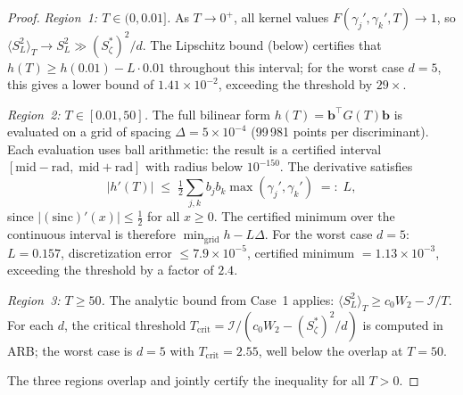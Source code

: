 \documentclass[12pt,reqno]{amsart}
\theoremstyle{plain}
\theoremstyle{definition}
\theoremstyle{remark}
\begin{document}
\begin{proof}
\smallskip\noindent\emph{Region~1: $T \in (0, 0.01]$.}  As $T \to 0^+$, all kernel values $F(\gamma_j', \gamma_k', T) \to 1$, so $\langle S_L^2\rangle_T \to S_L^2 \gg (S_\zeta^*)^2/d$.  The Lipschitz bound (below) certifies that $h(T) \geq h(0.01) - L \cdot 0.01$ throughout this interval; for the worst case $d = 5$, this gives a lower bound of $1.41 \times 10^{-2}$, exceeding the threshold by $29\times$.

\smallskip\noindent\emph{Region~2: $T \in [0.01, 50]$.}  The full bilinear form $h(T) = \mathbf{b}^\top G(T)\mathbf{b}$ is evaluated on a grid of spacing $\Delta = 5 \times 10^{-4}$ (99\,981 points per discriminant).  Each evaluation uses ball arithmetic: the result is a certified interval $[\mathrm{mid} - \mathrm{rad},\; \mathrm{mid} + \mathrm{rad}]$ with radius below $10^{-150}$.  The derivative satisfies
\[
  |h'(T)| \;\leq\; \tfrac{1}{2}\sum_{j,k} b_j b_k \max(\gamma_j', \gamma_k') \;=:\; L,
\]
since $|(\mathrm{sinc})'(x)| \leq \tfrac{1}{2}$ for all $x \geq 0$.  The certified minimum over the continuous interval is therefore $\min_{\mathrm{grid}} h - L\Delta$.  For the worst case $d = 5$: $L = 0.157$, discretization error $\leq 7.9 \times 10^{-5}$, certified minimum $= 1.13 \times 10^{-3}$, exceeding the threshold by a factor of $2.4$.

\smallskip\noindent\emph{Region~3: $T \geq 50$.}  The analytic bound from Case~1 applies: $\langle S_L^2\rangle_T \geq c_0 W_2 - \mathcal{I}/T$.  For each $d$, the critical threshold $T_{\mathrm{crit}} = \mathcal{I}/(c_0 W_2 - (S_\zeta^*)^2/d)$ is computed in ARB; the worst case is $d = 5$ with $T_{\mathrm{crit}} = 2.55$, well below the overlap at $T = 50$.

\smallskip\noindent The three regions overlap and jointly certify the inequality for all $T > 0$.


\end{proof}
\end{document}
